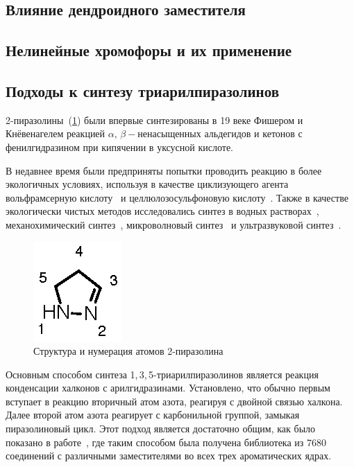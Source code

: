 \subsection{Влияние дендроидного заместителя}

\subsection{Нелинейные хромофоры и их применение}


\subsection{Подходы к синтезу триарилпиразолинов}
2-пиразолины~(\ref{fig:pyrazoline_structure}) были впервые синтезированы в 19 веке Фишером и Кнёвенагелем реакцией $\alpha,\,\beta-$ненасыщенных альдегидов и кетонов с фенилгидразином при кипячении в уксусной кислоте.

В недавнее время были предприняты попытки проводить реакцию в более экологичных условиях, используя в качестве циклизующего агента вольфрамсерную кислоту~\cite{Rahmatzadeh2015} и целлюлозосульфоновую кислоту~\cite{Daneshfar2015}. Также в качестве экологически чистых методов исследовались синтез в водных растворах~\cite{Markovic2015}, механохимический синтез~\cite{Zangade2013}, микроволновый синтез~\cite{Adhikari2012} и ультразвуковой синтез~\cite{Shelke2012}.

\begin{figure}
    \centering
    \includegraphics{sections/literature/img/pyrazoline_structure.eps}
    \caption{Структура и нумерация атомов 2-пиразолина}
    \label{fig:pyrazoline_structure}
\end{figure}

Основным способом синтеза 1,\,3,\,5-триарилпиразолинов является реакция конденсации халконов с арилгидразинами. Установлено, что обычно первым вступает в реакцию вторичный атом азота, реагируя с двойной связью халкона. Далее второй атом азота реагирует с карбонильной группой, замыкая пиразолиновый цикл. Этот подход является достаточно общим, как было показано в работе~\cite{Powers1998}, где таким способом была получена библиотека из \num{7680} соединений с различными заместителями во всех трех ароматических ядрах.

